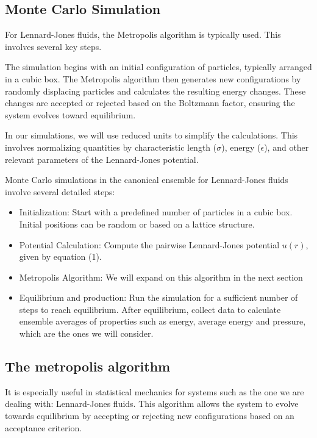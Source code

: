 \documentclass[a4paper,12pt]{article}
\begin{document}
\subsection{Monte Carlo Simulation}
For Lennard-Jones fluids, the Metropolis algorithm is typically used. This involves several key steps.
\begin{multicols}{2}
     The simulation begins with an initial configuration of particles, typically arranged in a cubic box. The Metropolis algorithm then generates new configurations by randomly displacing particles and calculates the resulting energy changes. These changes are accepted or rejected based on the Boltzmann factor, ensuring the system evolves toward equilibrium.

In our simulations, we will use reduced units to simplify the calculations. This involves normalizing quantities by characteristic length ($\sigma$), energy ($\epsilon$), and other relevant parameters of the Lennard-Jones potential\cite{NIST_LJ_Fluid}.

Monte Carlo simulations in the canonical ensemble  for Lennard-Jones fluids involve several detailed steps:
\begin{itemize}
    \item Initialization: Start with a predefined number of particles in a cubic box. Initial positions can be random or based on a lattice structure.
\item Potential Calculation: Compute the pairwise Lennard-Jones potential   $u(r)$, given by equation (1).
\item Metropolis Algorithm: We will expand on this algorithm in the next section 
\item Equilibrium and production: Run the simulation for a sufficient number of steps to reach equilibrium. After equilibrium, collect data to calculate ensemble averages of properties such as energy, average energy and pressure, which are the ones we will consider. 

\end{itemize}

\end{multicols}

\subsection{ The metropolis algorithm}
 It is especially useful in statistical mechanics for systems such as the one we are dealing with: Lennard-Jones fluids. This algorithm allows the system to evolve towards equilibrium by accepting or rejecting new configurations based on an acceptance criterion.
\end{document}
